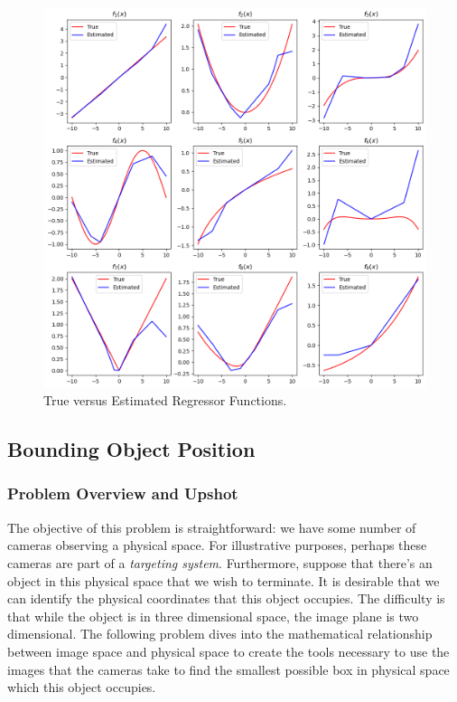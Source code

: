 \documentclass[12pt,reqno]{article}
\theoremstyle{definition}
\numberwithin{equation}{section}
\begin{document}
\begin{figure}[htbp]
    \centering
    \includegraphics[width=\linewidth]{../examples/364a/cvx-ch7/gen_add_regr_fit.png}
    \caption{True versus Estimated Regressor Functions.}
    \label{fig:gen_add_fit}
\end{figure}

\newpage

\subsection{Bounding Object Position}

\subsubsection*{Problem Overview and Upshot}
The objective of this problem is straightforward: we have some number of cameras observing
a physical space. For illustrative purposes, perhaps these cameras are part of a \textit{targeting system}.
Furthermore, suppose that there's an object in this physical space that we wish to terminate. It is desirable
that we can identify the physical coordinates that this object occupies. The difficulty is that while the object
is in three dimensional space, the image plane is two dimensional. The following
problem dives into the mathematical relationship between image space and physical space to create the tools
necessary to use the images that the cameras take to find the smallest possible box in physical space which this object occupies.
\end{document}

